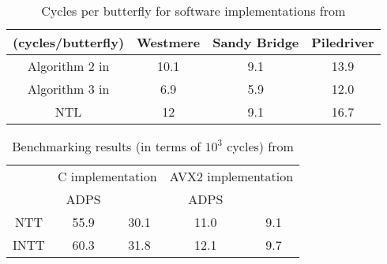 \documentclass[10pt,journal]{article}
\begin{document}
\begin{table}[]
\centering
\caption{Cycles per butterfly for software implementations from \cite{Harvey_2012} }
\begin{tabular}{|c|c|c|c|}
\hline
(cycles/butterfly)                   & Westmere & Sandy Bridge & Piledriver \\ \hline
Algorithm 2 in \cite{Harvey_2012} & 10.1     & 9.1          & 13.9       \\ \hline
Algorithm 3 in \cite{Harvey_2012} & 6.9      & 5.9          & 12.0       \\ \hline
NTL                                  & 12       & 9.1          & 16.7       \\ \hline
\end{tabular}
\end{table}



\begin{table}[]
\centering
\caption{Benchmarking results (in terms of $10^{3}$ cycles) from \cite{Longa2016}}
\begin{tabular}{|c|c|c|c|c|}
\hline
     & \multicolumn{2}{c|}{C implementation} & \multicolumn{2}{c|}{AVX2 implementation} \\ \cline{2-5} 
     & ADPS \cite{Alkim2015}              & \cite{Longa2016}                  & ADPS \cite{Alkim2015}                &  \cite{Longa2016}                  \\ \hline
NTT  & 55.9              & 30.1              & 11.0                & 9.1                \\ \hline
INTT & 60.3              & 31.8              & 12.1                & 9.7                \\ \hline
\end{tabular}
\end{table}
\end{document}
